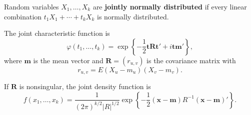 Random variables $X_1, \ldots, X_k$ are \textbf{jointly normally distributed} if every linear combination $t_1 X_1 + \cdots + t_k X_k$ is normally distributed.

The joint characteristic function is
$$\varphi(t_1, \ldots, t_k) = \exp\left\{-\frac{1}{2} \mathbf{t} \mathbf{R} \mathbf{t}' + i \mathbf{t} \mathbf{m}'\right\},$$
where $\mathbf{m}$ is the mean vector and $\mathbf{R} = (r_{u,v})$ is the covariance matrix with
$$r_{u,v} = E(X_u - m_u)(X_v - m_v).$$

If $\mathbf{R}$ is nonsingular, the joint density function is
$$f(x_1, \ldots, x_k) = \frac{1}{(2\pi)^{k/2} |R|^{1/2}} \exp\left\{-\frac{1}{2}(\mathbf{x} - \mathbf{m})R^{-1}(\mathbf{x} - \mathbf{m})'\right\}.$$
